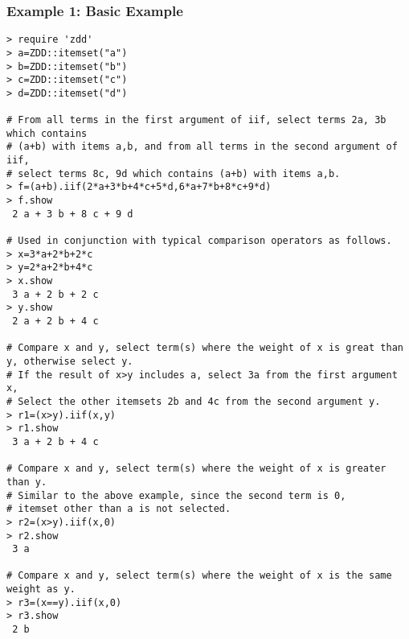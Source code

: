 \subsubsection*{Example 1: Basic Example}



\begin{Verbatim}[baselinestretch=0.7,frame=single]
> require 'zdd'
> a=ZDD::itemset("a")
> b=ZDD::itemset("b")
> c=ZDD::itemset("c")
> d=ZDD::itemset("d")

# From all terms in the first argument of iif, select terms 2a, 3b which contains
# (a+b) with items a,b, and from all terms in the second argument of iif,
# select terms 8c, 9d which contains (a+b) with items a,b.
> f=(a+b).iif(2*a+3*b+4*c+5*d,6*a+7*b+8*c+9*d)
> f.show
 2 a + 3 b + 8 c + 9 d

# Used in conjunction with typical comparison operators as follows.
> x=3*a+2*b+2*c
> y=2*a+2*b+4*c
> x.show
 3 a + 2 b + 2 c
> y.show
 2 a + 2 b + 4 c

# Compare x and y, select term(s) where the weight of x is great than y, otherwise select y.
# If the result of x>y includes a, select 3a from the first argument x,
# Select the other itemsets 2b and 4c from the second argument y.
> r1=(x>y).iif(x,y)
> r1.show
 3 a + 2 b + 4 c

# Compare x and y, select term(s) where the weight of x is greater than y.
# Similar to the above example, since the second term is 0,
# itemset other than a is not selected.
> r2=(x>y).iif(x,0)
> r2.show
 3 a

# Compare x and y, select term(s) where the weight of x is the same weight as y.
> r3=(x==y).iif(x,0)
> r3.show
 2 b
\end{Verbatim}
